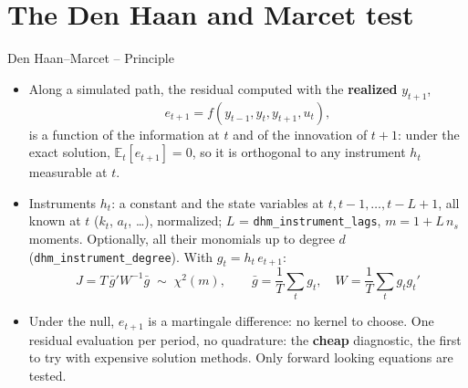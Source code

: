 \documentclass[11pt,aspectratio=169]{beamer}
\newcommand{\E}{\mathbb{E}}
\newcommand{\code}[1]{\texttt{#1}}
\begin{document}
\section{The Den Haan and Marcet test}

\begin{frame}{Den Haan--Marcet -- Principle}

\begin{itemize}

\item Along a simulated path, the residual computed with the \textbf{realized} $y_{t+1}$,
  \[
  e_{t+1} = f(y_{t-1}, y_t, y_{t+1}, u_t),
  \]
  is a function of the information at $t$ and of the innovation of $t+1$: under the exact solution, $\E_t[e_{t+1}]=0$, so it is orthogonal to any instrument $h_t$ measurable at $t$.\newline

\item Instruments $h_t$: a constant and the state variables at $t, t-1, \dots, t-L+1$, all known at $t$ ($k_t$, $a_t$, \dots), normalized; $L$ = \code{dhm\_instrument\_lags}, $m = 1 + L\,n_s$ moments. Optionally, all their monomials up to degree $d$ (\code{dhm\_instrument\_degree}). With $g_t = h_t\,e_{t+1}$:
  \[
  \boxed{J = T\,\bar g' W^{-1}\bar g \;\sim\; \chi^2(m),\qquad \bar g = \frac1T\sum_t g_t,\quad W = \frac1T\sum_t g_tg_t'}
  \]

\item Under the null, $e_{t+1}$ is a martingale difference: no kernel to choose. One residual evaluation per period, no quadrature: the \textbf{cheap} diagnostic, the first to try with expensive solution methods. Only forward looking equations are tested.

\end{itemize}

\end{frame}
\end{document}
